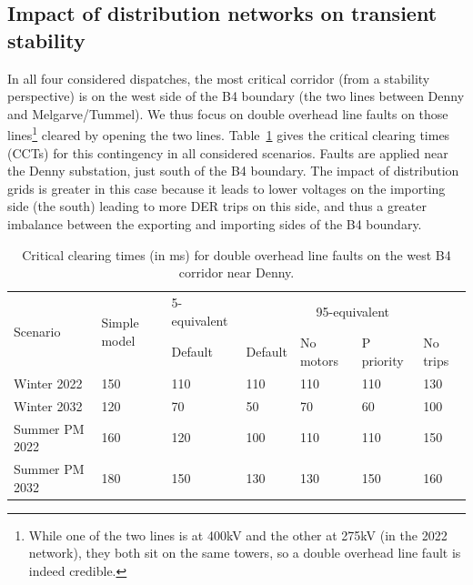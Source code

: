 \subsection{Impact of distribution networks on transient stability}
\label{sec:CIGRE_results}

In all four considered dispatches, the most critical corridor (from a stability perspective) is on the west side of the B4 boundary (\ie the two lines between Denny and Melgarve/Tummel). We thus focus on double overhead line faults on those lines\footnote{While one of the two lines is at 400kV and the other at 275kV (in the 2022 network), they both sit on the same towers, so a double overhead line fault is indeed credible.} cleared by opening the two lines. Table~\ref{tab:CIGRE_CCT} gives the critical clearing times (CCTs) for this contingency in all considered scenarios. Faults are applied near the Denny substation, \ie just south of the B4 boundary. The impact of distribution grids is greater in this case because it leads to lower voltages on the importing side (\ie the south) leading to more DER trips on this side, and thus a greater imbalance between the exporting and importing sides of the B4 boundary.

\begin{table}
\centering
\caption{Critical clearing times (in ms) for double overhead line faults on the west B4 corridor near Denny.}
\label{tab:CIGRE_CCT}
\begin{tabular}{@{}lllllll@{}}
\toprule
\multirow{2}{*}{Scenario} & \multirow{2}{*}{Simple model} & 5-equivalent & \multicolumn{4}{c}{95-equivalent}                     \\ \cmidrule(lr){3-3} \cmidrule(lr){4-7}
                            &                                 & Default & Default & No motors & P priority & No trips \\ \midrule
Winter   2022             & 150                             & 110     & 110     & 110       & 110        & 130      \\
Winter   2032             & 120                             & 70      & 50      & 70        & 60         & 100      \\
Summer   PM 2022          & 160                             & 120     & 100     & 110       & 110        & 150      \\
Summer   PM 2032          & 180                             & 150     & 130     & 130       & 150        & 160      \\ \bottomrule
\end{tabular}
\end{table}


